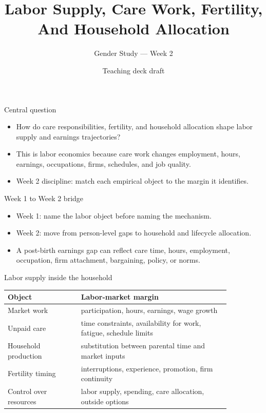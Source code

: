 \documentclass[aspectratio=169,11pt]{beamer}
\title{Labor Supply, Care Work, Fertility, And Household Allocation}
\subtitle{Gender Study --- Week 2}
\author{Teaching deck draft}
\date{}
\begin{document}
\begin{frame}
  \titlepage
\end{frame}

\begin{frame}{Central question}
\begin{itemize}
    \item How do care responsibilities, fertility, and household allocation shape labor supply and earnings trajectories?
    \item This is labor economics because care work changes employment, hours, earnings, occupations, firms, schedules, and job quality.
    \item Week 2 discipline: match each empirical object to the margin it identifies.
\end{itemize}
\end{frame}

\begin{frame}{Week 1 to Week 2 bridge}
\begin{itemize}
    \item Week 1: name the labor object before naming the mechanism.
    \item Week 2: move from person-level gaps to household and lifecycle allocation.
    \item A post-birth earnings gap can reflect care time, hours, employment, occupation, firm attachment, bargaining, policy, or norms.
\end{itemize}
\end{frame}

\begin{frame}{Labor supply inside the household}
\small
\begin{tabular}{p{0.28\linewidth} p{0.58\linewidth}}
\toprule
Object & Labor-market margin \\
\midrule
Market work & participation, hours, earnings, wage growth \\
Unpaid care & time constraints, availability for work, fatigue, schedule limits \\
Household production & substitution between parental time and market inputs \\
Fertility timing & interruptions, experience, promotion, firm continuity \\
Control over resources & labor supply, spending, care allocation, outside options \\
\bottomrule
\end{tabular}
\end{frame}
\end{document}
